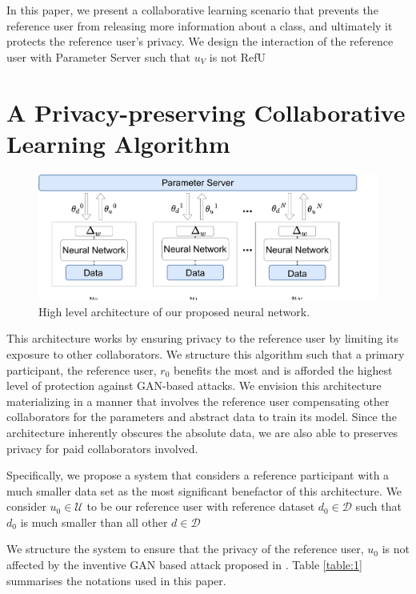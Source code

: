 \documentclass[conference]{IEEEtran}
\begin{document}
In this paper, we present a collaborative learning scenario that prevents the reference user from releasing more
information about a class, and ultimately it protects the reference user's privacy. We design the interaction of the reference user
with Parameter Server such that $u_V$ is not RefU

\section{A Privacy-preserving Collaborative Learning Algorithm}

\begin{figure}[!h]
\includegraphics[width=\textwidth, keepaspectratio]{HighLevelArch}
\caption{High level architecture of our proposed neural network.}
\label{fig:HighLevel}
\end{figure}

This architecture works by ensuring privacy to the reference user by limiting its exposure to other collaborators. We structure this algorithm such that a primary participant, the reference user, $r_0$ benefits the most and is afforded the highest level of protection against GAN-based attacks. We envision this architecture materializing in a manner that involves the reference user compensating other collaborators for the parameters and abstract data to train its model. Since the architecture inherently obscures the absolute data, we are also able to preserves privacy for paid collaborators involved.


Specifically, we propose a system that considers a reference participant with a much smaller data set as the most significant benefactor of this architecture. We consider $u_0\in\mathcal{U}$ to be our reference user with reference dataset $d_0\in\mathcal{D}$ such that $d_0$ is much smaller than all other $d \in\mathcal{D}$


We structure the system to ensure that the privacy of the reference
user, $u_0$ is not affected by the inventive GAN based attack proposed in \cite{hitaj2017deep}. Table \ref{table:1} summarises the notations used in this
paper.
\end{document}
